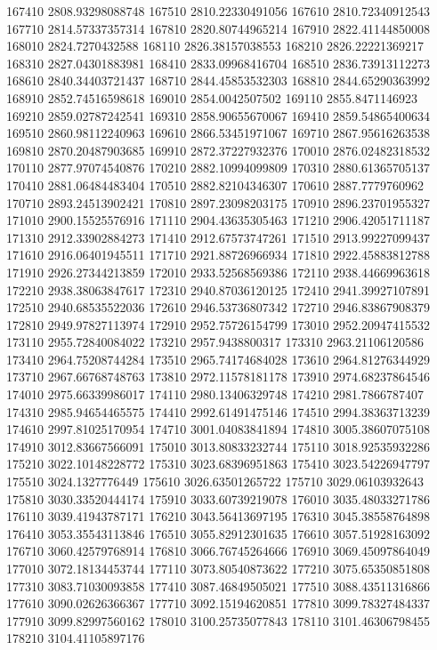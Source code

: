 {167410 2808.93298088748
167510 2810.22330491056
167610 2810.72340912543
167710 2814.57337357314
167810 2820.80744965214
167910 2822.41144850008
168010 2824.7270432588
168110 2826.38157038553
168210 2826.22221369217
168310 2827.04301883981
168410 2833.09968416704
168510 2836.73913112273
168610 2840.34403721437
168710 2844.45853532303
168810 2844.65290363992
168910 2852.74516598618
169010 2854.0042507502
169110 2855.8471146923
169210 2859.02787242541
169310 2858.90655670067
169410 2859.54865400634
169510 2860.98112240963
169610 2866.53451971067
169710 2867.95616263538
169810 2870.20487903685
169910 2872.37227932376
170010 2876.02482318532
170110 2877.97074540876
170210 2882.10994099809
170310 2880.61365705137
170410 2881.06484483404
170510 2882.82104346307
170610 2887.7779760962
170710 2893.24513902421
170810 2897.23098203175
170910 2896.23701955327
171010 2900.15525576916
171110 2904.43635305463
171210 2906.42051711187
171310 2912.33902884273
171410 2912.67573747261
171510 2913.99227099437
171610 2916.06401945511
171710 2921.88726966934
171810 2922.45883812788
171910 2926.27344213859
172010 2933.52568569386
172110 2938.44669963618
172210 2938.38063847617
172310 2940.87036120125
172410 2941.39927107891
172510 2940.68535522036
172610 2946.53736807342
172710 2946.83867908379
172810 2949.97827113974
172910 2952.75726154799
173010 2952.20947415532
173110 2955.72840084022
173210 2957.9438800317
173310 2963.21106120586
173410 2964.75208744284
173510 2965.74174684028
173610 2964.81276344929
173710 2967.66768748763
173810 2972.11578181178
173910 2974.68237864546
174010 2975.66339986017
174110 2980.13406329748
174210 2981.7866787407
174310 2985.94654465575
174410 2992.61491475146
174510 2994.38363713239
174610 2997.81025170954
174710 3001.04083841894
174810 3005.38607075108
174910 3012.83667566091
175010 3013.80833232744
175110 3018.92535932286
175210 3022.10148228772
175310 3023.68396951863
175410 3023.54226947797
175510 3024.1327776449
175610 3026.63501265722
175710 3029.06103932643
175810 3030.33520444174
175910 3033.60739219078
176010 3035.48033271786
176110 3039.41943787171
176210 3043.56413697195
176310 3045.38558764898
176410 3053.35543113846
176510 3055.82912301635
176610 3057.51928163092
176710 3060.42579768914
176810 3066.76745264666
176910 3069.45097864049
177010 3072.18134453744
177110 3073.80540873622
177210 3075.65350851808
177310 3083.71030093858
177410 3087.46849505021
177510 3088.43511316866
177610 3090.02626366367
177710 3092.15194620851
177810 3099.78327484337
177910 3099.82997560162
178010 3100.25735077843
178110 3101.46306798455
178210 3104.41105897176
}
